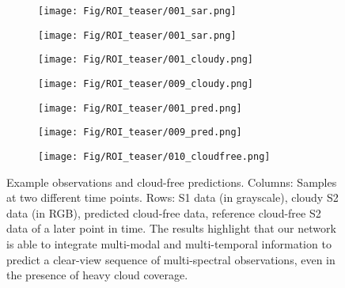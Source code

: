 \documentclass[journal]{IEEEtran}
\begin{document}
\begin{figure}[h!tb]
  \centering
  \begin{subfigure}[b]{0.48\linewidth}
    \texttt{[image: Fig/ROI\_teaser/001\_sar.png]}
  \end{subfigure}
    \begin{subfigure}[b]{0.48\linewidth}
    \texttt{[image: Fig/ROI\_teaser/001\_sar.png]}
  \end{subfigure}
  
  \begin{subfigure}[b]{0.48\linewidth}
    \texttt{[image: Fig/ROI\_teaser/001\_cloudy.png]}
  \end{subfigure}
    \begin{subfigure}[b]{0.48\linewidth}
    \texttt{[image: Fig/ROI\_teaser/009\_cloudy.png]}
  \end{subfigure}

\begin{subfigure}[b]{0.48\linewidth}
    \texttt{[image: Fig/ROI\_teaser/001\_pred.png]}
  \end{subfigure}
    \begin{subfigure}[b]{0.48\linewidth}
    \texttt{[image: Fig/ROI\_teaser/009\_pred.png]}
  \end{subfigure}


  \begin{subfigure}[tb]{0.975\linewidth}
    \texttt{[image: Fig/ROI\_teaser/010\_cloudfree.png]}
  \end{subfigure}
  \caption{Example observations and cloud-free predictions. Columns: Samples at two different time points. Rows: S1 data (in grayscale), cloudy S2 data (in RGB), predicted cloud-free  data, reference cloud-free S2 data of a later point in time. The results highlight that our network is able to integrate multi-modal and multi-temporal information to predict a clear-view sequence of multi-spectral observations, even in the presence of heavy cloud coverage.}
  \label{fig:teaser}
\end{figure}
\end{document}

